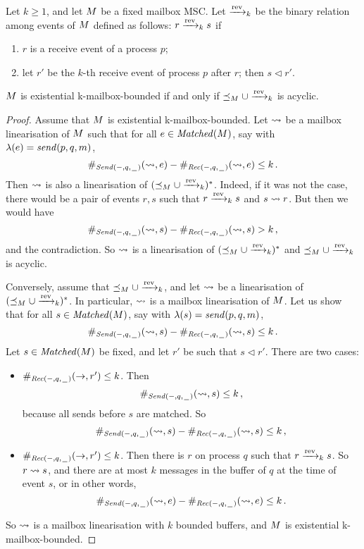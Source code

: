 Let $k\geq 1$, and let $\msc$ be a fixed mailbox MSC. Let $\revb$ be the binary relation among events of $\msc$ defined as follows: $r\revb s$ if
\begin{enumerate}
\item $r$ is a receive event of a process $p$;
\item let $r'$ be the $k$-th receive event of process $p$ after $r$; then
$s\lhd r'$.
\end{enumerate}

\begin{lemma}\label{lem:exists-k-mailbox-acyclicity-condition}
$\msc$ is existential k-mailbox-bounded if and only if $\preceq_M\cup\revb$ is
acyclic.
\end{lemma}

\begin{proof}
Assume that $\msc$ is existential k-mailbox-bounded. Let $\linrel$ be a mailbox
linearisation of $\msc$ such that
for all $e \in \Matched{\msc}$,
say with $\lambda(e) = \sact{p}{q}{\msg}$,
\[\sametype{e}{\pqsAct{-}{q}}{\linrel} - \sametype{e}{\pqrAct{-}{q}}{\linrel}
\leq k\,.\]
Then $\linrel$ is also a linearisation of $(\preceq_M\cup\revb)^*$. Indeed,
if it was not the case, there would be a pair of events $r,s$ such
that $r\revb s$ and $s\linrel r$. But then we would have
\[\sametype{s}{\pqsAct{-}{q}}{\linrel} - \sametype{s}{\pqrAct{-}{q}}{\linrel}
> k\,,\]
and the contradiction. So $\linrel$ is
a linearisation of $(\preceq_M\cup\revb)^*$ and $\preceq_M\cup\revb$ is
acyclic.

Conversely, assume that $\preceq_M\cup\revb$, and let
$\linrel$ be a linearisation of $(\preceq_M\cup\revb)^*$.
In particular, $\linrel$ is a mailbox linearisation of $\msc$.
Let us show that
for all $s \in \Matched{\msc}$,
say with $\lambda(s) = \sact{p}{q}{\msg}$,
\[\sametype{s}{\pqsAct{-}{q}}{\linrel} - \sametype{s}{\pqrAct{-}{q}}{\linrel}
\leq k\,.\]
Let $s\in\Matched{\msc}$ be fixed, and let $r'$ be such that
$s\lhd r'$. There are two cases:
\begin{itemize}
\item $\sametype{r'}{\pqrAct{-}{q}}{\procrel}\leq k$. Then
\[\sametype{s}{\pqsAct{-}{q}}{\linrel}\leq k\,,\] because all sends before $s$
are matched. So \[\sametype{s}{\pqsAct{-}{q}}{\linrel} - \sametype{s}{\pqrAct{-}{q}}{\linrel}
\leq k\,,\]
\item $\sametype{r'}{\pqrAct{-}{q}}{\procrel}\leq k$. Then there is
$r$ on process $q$ such that $r\revb s$. So $r\linrel s$, and
there are at most $k$ messages in the buffer of $q$ at the time of event $s$, or in other words,
\[\sametype{e}{\pqsAct{-}{q}}{\linrel} - \sametype{e}{\pqrAct{-}{q}}{\linrel}
\leq k\,.\]
\end{itemize}
So $\linrel$ is a mailbox linearisation with $k$ bounded buffers,
and $\msc$ is existential k-mailbox-bounded.
\end{proof}
